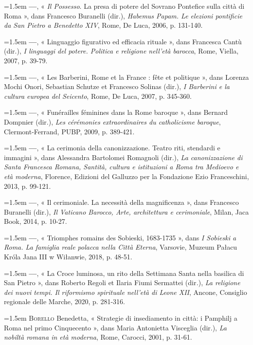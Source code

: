 \documentclass[12pt,twoside,openany]{book}
\newenvironment{PurhBibliography}
  {%
    \par
    \setlength{\parindent}{0pt}%
    \setlength{\leftskip}{0pt}%
  }
  {%
    \par
  }
\begin{document}
\begin{PurhBibliography}
\noindent\hangindent=1.5em \textbf{—}, « \textit{Il Possesso}. La presa di potere del Sovrano Pontefice sulla città di Roma », dans Francesco Buranelli (dir.),\textit{ Habemus Papam. Le elezioni pontificie da San Pietro a Benedetto XIV}, Rome, De Luca, 2006, p. 131-140.\par
\noindent\hangindent=1.5em \textbf{—}, « Linguaggio figurativo ed efficacia rituale », dans Francesca Cantù (dir.), \textit{I linguaggi del potere. Politica e religione nell’età barocca}, Rome, Viella, 2007, p. 39-79.\par
\noindent\hangindent=1.5em \textbf{—}, « Les Barberini, Rome et la France : fête et politique », dans Lorenza Mochi Onori, Sebastian Schutze et Francesco Solinas (dir.), \textit{I Barberini e la cultura europea del Seicento}, Rome, De Luca, 2007, p. 345-360.\par
\noindent\hangindent=1.5em \textbf{—}, « Funérailles féminines dans la Rome baroque », dans Bernard Dompnier (dir.), \textit{Les cérémonies extraordinaires du catholicisme baroque}, Clermont-Ferrand, PUBP, 2009, p. 389-421.\par
\noindent\hangindent=1.5em \textbf{—}, « La cerimonia della canonizzazione. Teatro riti, stendardi e immagini », dans Alessandra Bartolomei Romagnoli (dir.), \textit{La canonizzazione di Santa Francesca Romana, Santità, cultura e istituzioni a Roma tra Medioevo e età moderna}, Florence, Edizioni del Galluzzo per la Fondazione Ezio Franceschini, 2013, p. 99-121.\par
\noindent\hangindent=1.5em \textbf{—}, « Il cerimoniale. La necessità della magnificenza », dans Francesco Buranelli (dir.), \textit{Il Vaticano Barocco, Arte, architettura e cerimoniale}, Milan, Jaca Book, 2014, p. 10-27.\par
\noindent\hangindent=1.5em \textbf{—}, « Triomphes romains des Sobieski, 1683-1735 », dans \textit{I Sobieski a Roma. La famiglia reale polacca nella Città Eterna}, Varsovie, Muzeum Pałacu Króla Jana \textsc{III} w Wiłanwie, 2018, p. 48-51.\par
\noindent\hangindent=1.5em \textbf{—}, « La Croce luminosa, un rito della Settimana Santa nella basilica di San Pietro », dans Roberto Regoli et Ilaria Fiumi Sermattei (dir\textit{.}),\textit{ La religione dei nuovi tempi. Il riformismo spirituale nell’età di Leone XII}, Ancone, Consiglio regionale delle Marche, 2020, p. 281-316.\par
\noindent\hangindent=1.5em \textsc{Borello} Benedetta, « Strategie di insediamento in città: i Pamphilj a Roma nel primo Cinquecento », dans Maria Antonietta Visceglia (dir.), \textit{La nobiltà romana in età moderna}, Rome, Carocci, 2001, p. 31-61.\par

\end{PurhBibliography}
\end{document}
